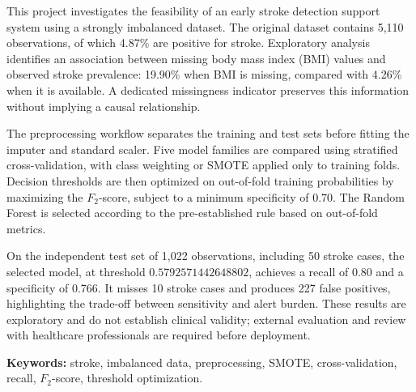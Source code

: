 This project investigates the feasibility of an early stroke detection support system using a strongly imbalanced dataset. The original dataset contains 5,110 observations, of which 4.87\% are positive for stroke. Exploratory analysis identifies an association between missing body mass index (BMI) values and observed stroke prevalence: 19.90\% when BMI is missing, compared with 4.26\% when it is available. A dedicated missingness indicator preserves this information without implying a causal relationship.

The preprocessing workflow separates the training and test sets before fitting the imputer and standard scaler. Five model families are compared using stratified cross-validation, with class weighting or SMOTE applied only to training folds. Decision thresholds are then optimized on out-of-fold training probabilities by maximizing the \(F_2\)-score, subject to a minimum specificity of 0.70. The Random Forest is selected according to the pre-established rule based on out-of-fold metrics.

On the independent test set of 1,022 observations, including 50 stroke cases, the selected model, at threshold \(0.5792571442648802\), achieves a recall of 0.80 and a specificity of 0.766. It misses 10 stroke cases and produces 227 false positives, highlighting the trade-off between sensitivity and alert burden. These results are exploratory and do not establish clinical validity; external evaluation and review with healthcare professionals are required before deployment.

\medskip
\noindent\textbf{Keywords:} stroke, imbalanced data, preprocessing, SMOTE, cross-validation, recall, \(F_2\)-score, threshold optimization.
